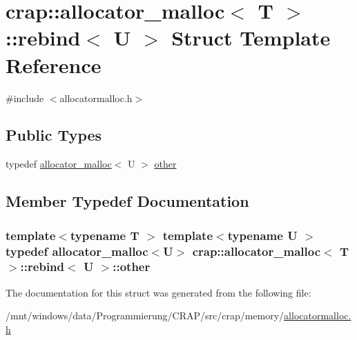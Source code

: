 \hypertarget{structcrap_1_1allocator__malloc_1_1rebind}{\section{crap\-:\-:allocator\-\_\-malloc$<$ T $>$\-:\-:rebind$<$ U $>$ Struct Template Reference}
\label{structcrap_1_1allocator__malloc_1_1rebind}
}


{\ttfamily \#include $<$allocatormalloc.\-h$>$}

\subsection*{Public Types}
\begin{DoxyCompactItemize}
\item 
typedef \hyperlink{classcrap_1_1allocator__malloc}{allocator\-\_\-malloc}$<$ U $>$ \hyperlink{structcrap_1_1allocator__malloc_1_1rebind_a550f8ed979b8144b7af5aaef5949af1e}{other}
\end{DoxyCompactItemize}


\subsection{Member Typedef Documentation}
\hypertarget{structcrap_1_1allocator__malloc_1_1rebind_a550f8ed979b8144b7af5aaef5949af1e}{
\subsubsection[{other}]{\setlength{\rightskip}{0pt plus 5cm}template$<$typename T $>$ template$<$typename U $>$ typedef {\bf allocator\-\_\-malloc}$<$U$>$ {\bf crap\-::allocator\-\_\-malloc}$<$ T $>$\-::{\bf rebind}$<$ U $>$\-::{\bf other}}}\label{structcrap_1_1allocator__malloc_1_1rebind_a550f8ed979b8144b7af5aaef5949af1e}


The documentation for this struct was generated from the following file\-:\begin{DoxyCompactItemize}
\item 
/mnt/windows/data/\-Programmierung/\-C\-R\-A\-P/src/crap/memory/\hyperlink{allocatormalloc_8h}{allocatormalloc.\-h}\end{DoxyCompactItemize}
